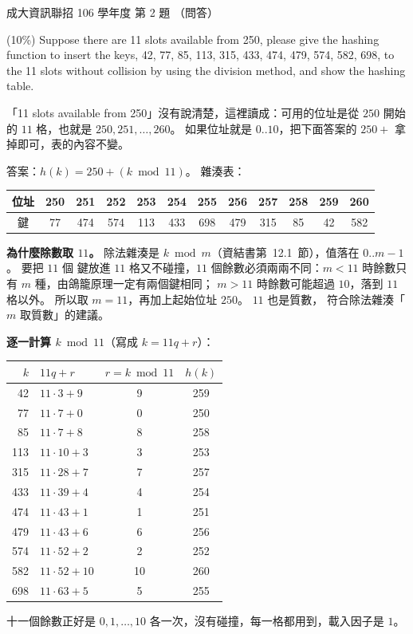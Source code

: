 \begin{pastexam}[label={px:ncku-106-prog-02}]{成大資訊聯招 106 學年度 第 2 題}
（問答）

(10\%) Suppose there are 11 slots available from 250, please give the hashing function to insert
the keys, 42, 77, 85, 113, 315, 433, 474, 479, 574, 582, 698, to the 11 slots without collision by
using the division method, and show the hashing table.
\end{pastexam}

\begin{pastsoln}
「11 slots available from 250」沒有說清楚，這裡讀成：可用的位址是從 $250$ 開始的 $11$ 格，也就是
$250, 251, \ldots, 260$。 如果位址就是 $0..10$，把下面答案的 $250 +$ 拿掉即可，表的內容不變。

答案：$h(k) = 250 + (k \bmod 11)$。 雜湊表：
\begin{center}
\small
\begin{tabular}{c*{11}{c}}
\toprule
位址 & 250 & 251 & 252 & 253 & 254 & 255 & 256 & 257 & 258 & 259 & 260 \\
\midrule
鍵 & 77 & 474 & 574 & 113 & 433 & 698 & 479 & 315 & 85 & 42 & 582 \\
\bottomrule
\end{tabular}
\end{center}

\textbf{為什麼除數取 $11$。} 除法雜湊是 $k \bmod m$（資結書第~12.1~節），值落在 $0..m-1$。 要把 $11$ 個
鍵放進 $11$ 格又不碰撞，$11$ 個餘數必須兩兩不同：$m < 11$ 時餘數只有 $m$ 種，由鴿籠原理一定有兩個鍵相同；
$m > 11$ 時餘數可能超過 $10$，落到 $11$ 格以外。 所以取 $m = 11$，再加上起始位址 $250$。 $11$ 也是質數，
符合除法雜湊「$m$ 取質數」的建議。

\textbf{逐一計算 $k \bmod 11$}（寫成 $k = 11q + r$）：
\begin{center}
\small
\begin{tabular}{rlcc}
\toprule
$k$ & $11q + r$ & $r = k \bmod 11$ & $h(k)$ \\
\midrule
42 & $11 \cdot 3 + 9$ & 9 & 259 \\
77 & $11 \cdot 7 + 0$ & 0 & 250 \\
85 & $11 \cdot 7 + 8$ & 8 & 258 \\
113 & $11 \cdot 10 + 3$ & 3 & 253 \\
315 & $11 \cdot 28 + 7$ & 7 & 257 \\
433 & $11 \cdot 39 + 4$ & 4 & 254 \\
474 & $11 \cdot 43 + 1$ & 1 & 251 \\
479 & $11 \cdot 43 + 6$ & 6 & 256 \\
574 & $11 \cdot 52 + 2$ & 2 & 252 \\
582 & $11 \cdot 52 + 10$ & 10 & 260 \\
698 & $11 \cdot 63 + 5$ & 5 & 255 \\
\bottomrule
\end{tabular}
\end{center}
十一個餘數正好是 $0, 1, \ldots, 10$ 各一次，沒有碰撞，每一格都用到，載入因子是 $1$。
\end{pastsoln}
